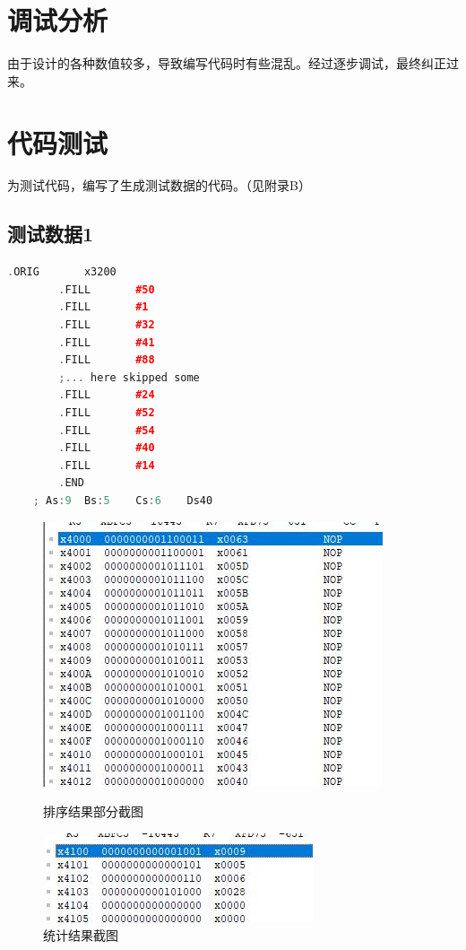 \documentclass[UTF8]{article}
\begin{document}
	\section{调试分析}
	由于设计的各种数值较多，导致编写代码时有些混乱。经过逐步调试，最终纠正过来。\par
	
	\section{代码测试}
	为测试代码，编写了生成测试数据的代码。（见附录B）\par
	\subsection{测试数据1}
	\begin{lstlisting}[language=C++]
		.ORIG		x3200
		.FILL		#50
		.FILL		#1
		.FILL		#32
		.FILL		#41
		.FILL		#88
		;... here skipped some
		.FILL		#24
		.FILL		#52
		.FILL		#54
		.FILL		#40
		.FILL		#14
		.END
	; As:9	Bs:5	Cs:6	Ds40
	\end{lstlisting}
	
	\begin{figure}[H]
		\begin{minipage}[H]{0.48\linewidth}
			\centering
			\includegraphics[scale=0.45]{1_1.jpg}
			\caption{排序结果部分截图}
			\label{1_1}
		\end{minipage}
		\begin{minipage}[H]{0.48\linewidth}
			\centering
			\includegraphics[scale=0.4]{1_2.jpg}
			\caption{统计结果截图}
			\label{1_2}
		\end{minipage}
	\end{figure}
\end{document}

